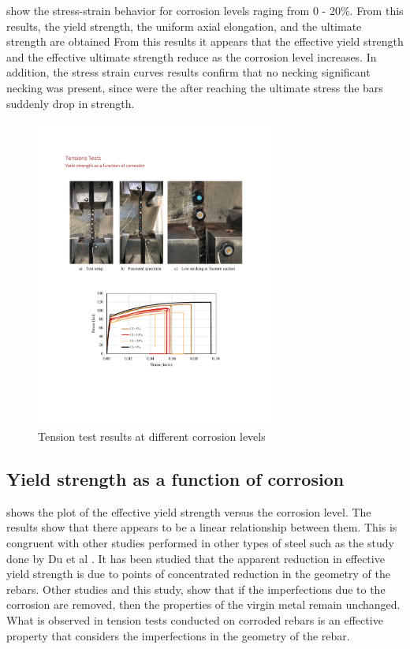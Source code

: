  show the stress-strain behavior for corrosion levels raging from 0 - 20\%. From this results, the yield strength, the uniform axial elongation, and the ultimate strength are obtained From this results it appears that the effective yield strength and the effective ultimate strength reduce as the corrosion level increases. In addition, the stress strain curves  results confirm that no necking significant necking was present, since were the after reaching the ultimate stress the bars suddenly drop  in strength. 

\begin{figure}[htbp]
	\centering
	\includegraphics[width=0.7\textwidth]{VAC Thesis 2.0/Chapter-4/figs/TensionTest_results_1.pdf}
	\caption{Tension test results at different corrosion levels}
	\label{fig:TensionTestResults_StressStrain}
\end{figure}

\subsection{Yield strength as a function of corrosion}
 shows the plot of the effective yield strength versus the corrosion level. The results show that there appears to be a linear relationship between them. This is congruent with other studies performed in other types of steel such as the study done by Du et al \cite{Du2005}. It has been studied that the apparent reduction in effective yield strength is due to points of concentrated reduction in the geometry of the rebars. Other studies \cite{Du2005}\cite{Barcley2018} and this study, show that if the imperfections due to the corrosion are removed, then the properties of the virgin metal remain unchanged. What is observed in tension tests conducted on corroded rebars is an effective property that considers the imperfections in the geometry of the rebar. 

